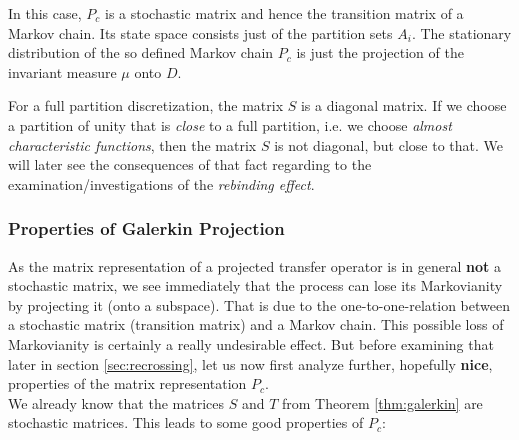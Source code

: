 In this case, $P_c$ is a stochastic matrix and hence the transition matrix of a Markov chain. 
Its state space consists just of the partition sets $A_i$. The stationary distribution of the so defined Markov chain $P_c$ is just the projection of the invariant measure $\mu$ onto $D$. 

For a full partition discretization, the matrix $S$ is a diagonal matrix. If we choose a partition of unity that is \textit{close} to a full partition, i.e. we choose \textit{almost characteristic functions}, then the matrix $S$ is not diagonal, but close to that. We will later see the consequences of that fact regarding to the examination/investigations of the \textit{rebinding effect}.

\subsubsection*{Properties of Galerkin Projection}

As the matrix representation of a projected transfer operator is in general \textbf{not} a stochastic matrix, %
we see immediately that the process can lose its Markovianity by projecting it (onto a subspace).
That is due to the one-to-one-relation between a stochastic matrix (transition matrix) and a Markov chain.
This possible loss of Markovianity is certainly a really undesirable effect. But before examining that later in section \ref{sec:recrossing}, let us now first analyze further, hopefully \textbf{nice}, properties of the matrix representation $P_c$.
\\

We already know that the matrices $S$ and $T$ from Theorem \ref{thm:galerkin} are stochastic matrices. This leads to some good properties of $P_c$:

